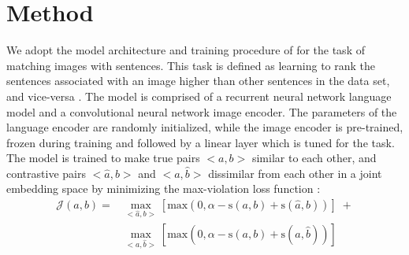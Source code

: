 \section{Method}


We adopt the model architecture and training procedure
of \cite{kadar2018conll} for the task of matching images with sentences. This task is defined as learning to rank the sentences associated with an image higher than other sentences in the data set, and vice-versa \citep{hodosh2013framing}. The model is comprised of 
a recurrent neural network language model and a 
convolutional neural network image encoder. 
The parameters of the 
language encoder are randomly initialized, while
the image encoder is pre-trained, frozen during 
training and followed by a linear layer which is
tuned for the task.  
The model is trained to make true pairs $<a,b>$ 
similar to each other, and contrastive pairs
$<\hat{a},b>$ and 
$<a,\hat{b}>$ dissimilar from each other in a joint
embedding space by minimizing the max-violation loss function
\citep{faghri2017vse++}:
%
\begin{equation}
\label{eq:maxviol}
\begin{split}
\mathcal{J}(a, b) = &\max_{<\hat{a}, b>}[\text{max}(0, \alpha - \text{s}(a,b) + \text{s}(\hat{a}, b))] \;+ \\ &\max_{<a, \hat{b}>}[\text{max}(0, \alpha - \text{s}(a,b) + \text{s}(a, \hat{b}))]
\end{split}
\end{equation}

